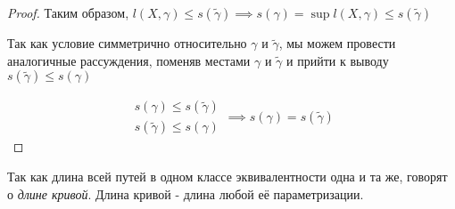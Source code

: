 \documentclass[../main.tex]{subfiles}
\begin{document}
\begin{proof}
    Таким образом, \( l \left( X, \gamma \right) \leq s\left( \tilde{ \gamma }\right) \implies s\left( \gamma \right)= \sup\limits_{ } l \left( X, \gamma \right) \leq s\left( \tilde{ \gamma }\right)\) 

    Так как условие симметрично относительно \( \gamma \) и \( \tilde{ \gamma }\), мы можем провести аналогичные рассуждения, поменяв местами \( \gamma \) и \( \tilde{ \gamma }\) и прийти к выводу \( s\left( \tilde\gamma \right) \leq s\left( \gamma \right)\)

    \begin{equation*}
        \begin{aligned}
            s\left( \gamma \right) \leq s\left( \tilde{ \gamma }\right)\\ 
            s\left( \tilde{ \gamma }\right) \leq s\left( \gamma \right)
        \end{aligned}
        \implies 
        s\left( \gamma \right)=s\left( \tilde{ \gamma }\right)
    \end{equation*}
\end{proof}

Так как длина всей путей в одном классе эквивалентности одна и та же, говорят о \emph{длине кривой}. Длина кривой - длина любой её параметризации.
\end{document}
